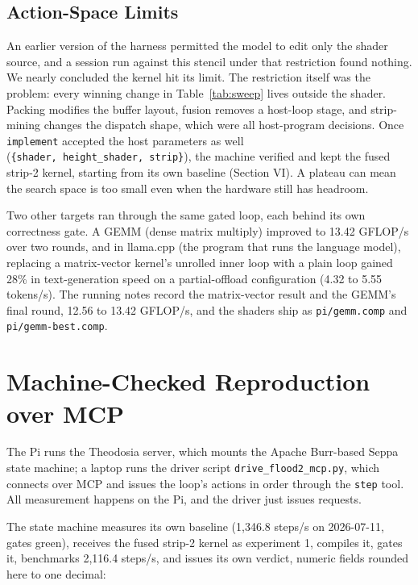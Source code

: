 \documentclass[conference]{IEEEtran}
\begin{document}
\subsection{Action-Space Limits}\label{action-space-limits}

An earlier version of the harness permitted the model to edit only the
shader source, and a session run against this stencil under that
restriction found nothing. We nearly concluded the kernel hit its limit.
The restriction itself was the problem: every winning change in
Table~\ref{tab:sweep} lives outside the shader. Packing
modifies the buffer layout, fusion removes a host-loop stage, and
strip-mining changes the dispatch shape, which were all host-program
decisions. Once \texttt{implement} accepted the host parameters as well
(\texttt{\{shader,\ height\_shader,\ strip\}}), the machine verified and
kept the fused strip-2 kernel, starting from its own baseline (Section
VI). A plateau can mean the search space is too small even when the
hardware still has headroom.

Two other targets ran through the same gated loop, each behind its own
correctness gate. A GEMM (dense matrix multiply) improved to 13.42
GFLOP/s over two rounds, and in llama.cpp (the program that runs the
language model), replacing a matrix-vector kernel's unrolled inner loop
with a plain loop gained 28\% in text-generation speed on a
partial-offload configuration (4.32 to 5.55 tokens/s). The running notes
record the matrix-vector result and the GEMM's final round, 12.56 to
13.42 GFLOP/s, and the shaders ship as \texttt{pi/gemm.comp} and
\texttt{pi/gemm-best.comp}.

\section{Machine-Checked Reproduction over
MCP}\label{machine-checked-reproduction-over-mcp}

The Pi runs the Theodosia server, which mounts the Apache Burr-based
Seppa state machine; a laptop runs the driver script
\texttt{drive\_flood2\_mcp.py}, which connects over MCP and issues the
loop's actions in order through the \texttt{step} tool. All measurement
happens on the Pi, and the driver just issues requests.

The state machine measures its own baseline (1,346.8 steps/s on
2026-07-11, gates green), receives the fused strip-2 kernel as
experiment 1, compiles it, gates it, benchmarks 2,116.4 steps/s, and
issues its own verdict, numeric fields rounded here to one decimal:
\end{document}
